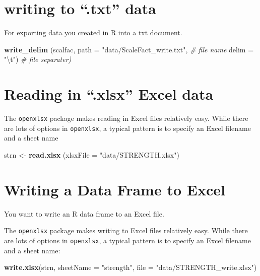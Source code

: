 \documentclass[
]{book}
\newenvironment{Shaded}{\begin{snugshade}}{\end{snugshade}}
\newcommand{\CharTok}[1]{\textcolor[rgb]{0.31,0.60,0.02}{#1}}
\newcommand{\CommentTok}[1]{\textcolor[rgb]{0.56,0.35,0.01}{\textit{#1}}}
\newcommand{\DataTypeTok}[1]{\textcolor[rgb]{0.13,0.29,0.53}{#1}}
\newcommand{\KeywordTok}[1]{\textcolor[rgb]{0.13,0.29,0.53}{\textbf{#1}}}
\newcommand{\NormalTok}[1]{#1}
\newcommand{\StringTok}[1]{\textcolor[rgb]{0.31,0.60,0.02}{#1}}
\begin{document}
\hypertarget{writing-to-.txt-data}{%
\section{writing to ``.txt'' data}\label{writing-to-.txt-data}}

For exporting data you created in R into a txt document.

\begin{Shaded}
\begin{Highlighting}[]
\KeywordTok{write_delim}\NormalTok{ (scalfac,}
            \DataTypeTok{path =} \StringTok{"data/ScaleFact_write.txt"}\NormalTok{, }\CommentTok{# file name}
            \DataTypeTok{delim =} \StringTok{"}\CharTok{\textbackslash{}t}\StringTok{"}\NormalTok{) }\CommentTok{# file separater)}
\end{Highlighting}
\end{Shaded}

\hypertarget{reading-in-.xlsx-excel-data}{%
\section{Reading in ``.xlsx'' Excel data}\label{reading-in-.xlsx-excel-data}}

The \texttt{openxlsx} package makes reading in Excel files relatively easy. While there are lots of options in \texttt{openxlsx}, a typical pattern is to specify an Excel filename and a sheet name

\begin{Shaded}
\begin{Highlighting}[]
\NormalTok{strn <-}\StringTok{  }\KeywordTok{read.xlsx}\NormalTok{ (}\DataTypeTok{xlsxFile =} \StringTok{"data/STRENGTH.xlsx"}\NormalTok{)}
\end{Highlighting}
\end{Shaded}

\hypertarget{writing-a-data-frame-to-excel}{%
\section{Writing a Data Frame to Excel}\label{writing-a-data-frame-to-excel}}

You want to write an R data frame to an Excel file.

The \texttt{openxlsx} package makes writing to Excel files relatively easy. While there are lots of options in \texttt{openxlsx}, a typical pattern is to specify an Excel filename and a sheet name:

\begin{Shaded}
\begin{Highlighting}[]
\KeywordTok{write.xlsx}\NormalTok{(strn,}
           \DataTypeTok{sheetName =} \StringTok{"strength"}\NormalTok{,}
           \DataTypeTok{file =} \StringTok{"data/STRENGTH_write.xlsx"}\NormalTok{)}
\end{Highlighting}
\end{Shaded}
\end{document}
